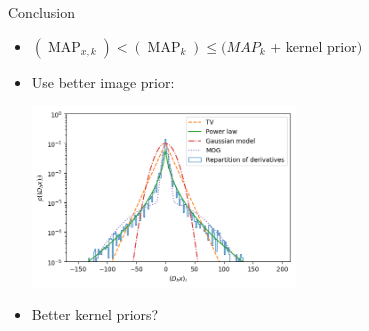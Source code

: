 \documentclass{beamer}
\DeclareMathOperator{\MAP}{MAP}
\begin{document}
\begin{frame}{Conclusion}
\begin{itemize}
	\item $(\MAP_{x,k}) < (\MAP_{k}) \le (MAP_k$ + kernel prior$)$
	\pause
	\item Use better image prior:
	\begin{center}
		\includegraphics[width=7cm]{images/graph_derivatives}
	\end{center}
	\pause
	\item Better kernel priors?
\end{itemize}
\end{frame}

	
\end{document}

